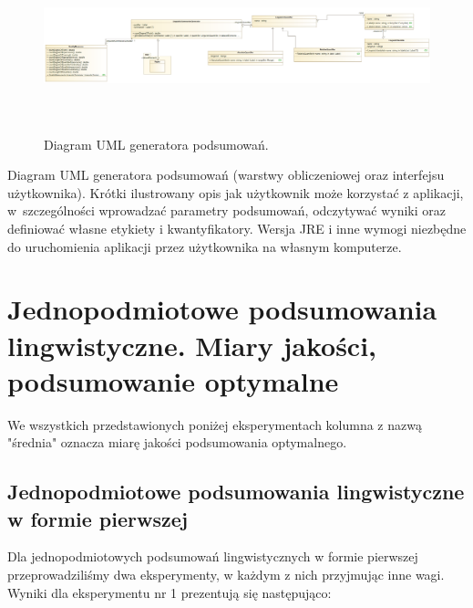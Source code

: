 \documentclass{classrep}
\begin{document}
\begin{figure}[H]
    \centering
    \includegraphics[width=14cm, height=5cm]{generator.png}
    \caption{Diagram UML generatora podsumowań.}
    \label{rysunek:generator}
\end{figure}

Diagram UML generatora podsumowań (warstwy obliczeniowej oraz interfejsu
użytkownika). Krótki ilustrowany opis jak użytkownik może korzystać z aplikacji, w~szczególności
wprowadzać parametry  podsumowań, odczytywać wyniki oraz definiować własne etykiety i
kwantyfikatory. Wersja JRE i inne wymogi niezbędne do uruchomienia aplikacji przez użytkownika na własnym komputerze. \\

\section{ Jednopodmiotowe podsumowania lingwistyczne. Miary jakości, podsumowanie optymalne}

We wszystkich przedstawionych poniżej eksperymentach kolumna z nazwą "średnia" oznacza miarę jakości podsumowania optymalnego.

\subsection{Jednopodmiotowe podsumowania lingwistyczne w formie pierwszej}

Dla jednopodmiotowych podsumowań lingwistycznych w formie pierwszej przeprowadziliśmy dwa eksperymenty, w każdym z nich przyjmując inne wagi. Wyniki dla eksperymentu nr 1 prezentują się następująco:
\end{document}
